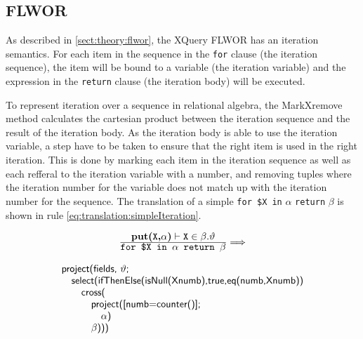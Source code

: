 \subsection{FLWOR}
\label{sect:translation:mXr:iteration}
As described in \ref{sect:theory:flwor}, the XQuery FLWOR has an iteration semantics. For each item in the
sequence in the \texttt{for} clause (the iteration sequence), the item will be bound to a variable (the iteration
variable) and the expression in the \texttt{return} clause (the iteration body) will be executed.

To represent iteration over a sequence in relational algebra, the MarkXremove method calculates the cartesian
product between the iteration sequence and the result of the iteration body. As the iteration body is able to use
the iteration variable, a step have to be taken to ensure that the right item is used in the right iteration. This
is done by marking each item in the iteration sequence as well as each refferal to the iteration variable with a
number, and removing tuples where the iteration number for the variable does not match up with the iteration
number for the sequence. The translation of a simple \texttt{for \$X in} $\alpha$ \texttt{return} $\beta$ is shown
in rule \ref{eq:translation:simpleIteration}.

\begin{equation}
\centering
\begin{array}{c}
	\frac{\displaystyle \textbf{put(}\texttt{X}\textbf{,}\alpha\textbf{)}\vdash\texttt{X}\in\beta . \vartheta}
	{\displaystyle \texttt{for \$X in }\alpha	\texttt{ return }\beta}
	
	\Longrightarrow 
	\\
	\mbox{} \\
	
	\begin{array}{l}
	\mbox{\textsf{project(fields, }} \vartheta \mbox{\textsf{;}} \\ \quad
	\mbox{\textsf{select(ifThenElse(isNull(Xnumb),true,eq(numb,Xnumb))}} \\ \quad \quad 
	\mbox{\textsf{cross(}} \\ \quad \quad \quad
	\mbox{\textsf{project([numb=counter()];}} \\ \quad \quad \quad \quad
	\alpha \mbox{\textsf{)}} \\ \quad \quad \quad 
	\beta \mbox{\textsf{)))}}
	\end{array}
\end{array}
\label{eq:translation:simpleIteration}
\end{equation}

